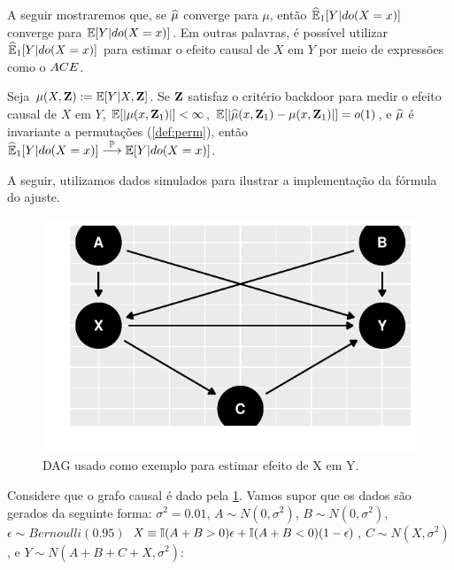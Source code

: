 A seguir mostraremos que,
se ${\widehat{\mu}}$ converge para $\mu$, então
${\widehat{{\mathbb E}}}_{1}[Y|do(X=x)]$ converge para ${\mathbb E}[Y|do(X=x)]$.
Em outras palavras, é possível utilizar
${\widehat{{\mathbb E}}}_{1}[Y|do(X=x)]$ para estimar o efeito causal de $X$ em $Y$
por meio de expressões como o ${ACE}$.

\begin{theorem}
 \label{thm:conv_ajuste}
 Seja $\mu(X,{\mathbf{Z}}) := {\mathbb E}[Y|X,{\mathbf{Z}}]$.
 Se ${\mathbf{Z}}$ satisfaz o critério backdoor para
 medir o efeito causal de $X$ em $Y$,
 ${\mathbb E}[|\mu(x,{\mathbf{Z}}_1)|] < \infty$,
 ${\mathbb E}[|{\widehat{\mu}}(x,{\mathbf{Z}}_1)-\mu(x,{\mathbf{Z}}_1)|] = o(1)$, 
 e ${\widehat{\mu}}$ é invariante a permutações (\cref{def:perm}), então
 ${\widehat{{\mathbb E}}}_{1}[Y|do(X=x)] \stackrel{{\mathbb P}}{\longrightarrow} {\mathbb E}[Y|do(X=x)]$.
\end{theorem}

A seguir, utilizamos dados simulados para
ilustrar a implementação da fórmula do ajuste.

\begin{example}
 \label{ex:backdoor_est_ajuste}
\begin{knitrout}
\color{fgcolor}\begin{figure}[t]

{\centering \includegraphics[width=\maxwidth]{./figures/backdoor_est_ex-1} 

}

\caption[DAG usado como exemplo para estimar efeito de X em Y]{DAG usado como exemplo para estimar efeito de X em Y.}\label{fig:backdoor_est_ex}
\end{figure}

\end{knitrout}

Considere que o grafo causal é
dado pela \cref{fig:backdoor_est_ex}.
Vamos supor que os dados são gerados da seguinte forma:
$\sigma^2 = 0.01$,
$A \sim N(0, \sigma^2)$, 
$B \sim N(0, \sigma^2)$,
$\epsilon \sim Bernoulli(0.95)$
$X \equiv {\mathbb I}(A + B > 0)\epsilon + {\mathbb I}(A + B < 0)(1-\epsilon)$,
$C \sim N(X, \sigma^2)$, e
$Y \sim N(A + B + C + X, \sigma^2)$:


\end{example}
